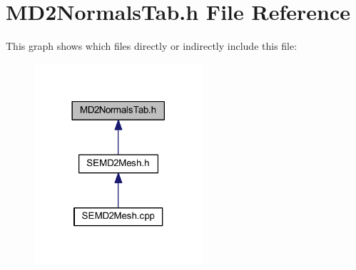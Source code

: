 \section{M\+D2\+Normals\+Tab.\+h File Reference}
\label{_m_d2_normals_tab_8h}
This graph shows which files directly or indirectly include this file\+:
\nopagebreak
\begin{figure}[H]
\begin{center}
\leavevmode
\includegraphics[width=177pt]{_m_d2_normals_tab_8h__dep__incl}
\end{center}
\end{figure}
